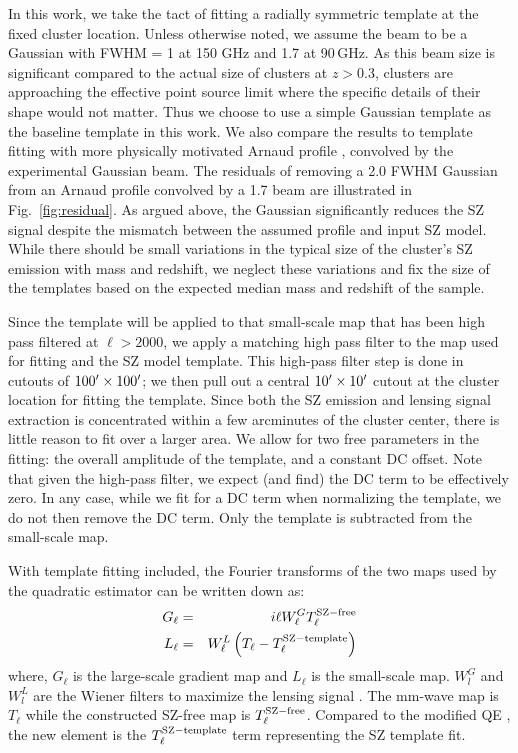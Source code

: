 {In this work, we take the tact of fitting a radially symmetric template at the fixed cluster location. 
Unless otherwise noted, we assume the beam to be a Gaussian with FWHM = 1\arcmin{} at 150 GHz and 1\arcmin.7 at 90\,GHz. 
As this beam size is significant compared to the actual size of clusters at $z>0.3$, clusters are approaching the effective point source limit where the specific details of their shape would not matter. 
Thus we choose to use a simple Gaussian template as the baseline template in this work. 
We also compare the results to template fitting with more physically motivated Arnaud profile \citep{arnaud10}, convolved by the experimental Gaussian beam.  
The residuals of removing a 2\arcmin.0 FWHM Gaussian from an Arnaud profile convolved by a 1\arcmin.7 beam are illustrated in Fig.~\ref{fig:residual}. 
As argued above, the Gaussian significantly reduces the SZ signal despite the mismatch between the assumed profile and input SZ model. 
While there should be small variations in the typical size of the cluster's SZ emission with mass and redshift, we neglect these variations and fix the size of the templates based on the expected median mass and redshift of the sample.

Since the template will be applied to that small-scale map that has been high pass filtered at $\ell > 2000$, we apply a matching high pass filter to the map used for fitting and the SZ model template. 
This high-pass filter step is done in cutouts of $100^{\prime} \times 100^{\prime}$; we then pull out a central $10^{\prime} \times 10^{\prime}$ cutout at the cluster location for fitting the template. 
Since both the SZ emission and lensing signal extraction is concentrated within a few arcminutes of the cluster center, there is little reason to fit over a larger area. 
We allow for two free parameters in the fitting: the overall amplitude of the template, and a constant DC offset. 
Note that given the high-pass filter, we expect (and find) the DC term to be effectively zero. 
In any case, while we fit for a DC term when normalizing the template, we do not then remove the DC term. 
Only the template is subtracted from the small-scale map.

With template fitting included, the Fourier transforms of the two maps used by the quadratic estimator can be written down as:
\begin{eqnarray}
G_{\ell} &=& i\ell W^{G}_{\ell} T^{\rm SZ-free}_{\ell}\\
L_{\ell} &=& W^{L}_{\ell} \left(T_{\ell} - T_\ell^{\rm SZ-template}\right)
\end{eqnarray}
where, $G_{\ell}$ is the large-scale gradient map and $L_{\ell}$ is the small-scale map. 
$W^{G}_{l}$ and $W^{L}_{l} $ are the Wiener filters to maximize the lensing signal \cite{hu06}. 
The mm-wave map is $T_{\ell}$ while the constructed SZ-free map is $T^{\rm SZ-free}_{\ell}$. 
Compared to the modified QE \citep{madhavacheril15,raghunathan18}, the new element is the $T_\ell^{\rm SZ-template}$ term representing the SZ template fit. 

}

